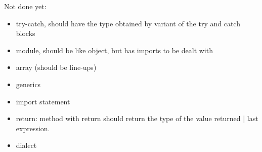  Not done yet:
 \begin{itemize}
 \item try-catch, should have the type obtained by variant of the try and catch blocks
 \item module, should be like object, but has imports to be dealt with
 \item array (should be line-ups)
 \item generics
 \item import statement
 \item return: method with return should return the type of the value returned | last expression.
 \item dialect
 \end{itemize}
 
 

